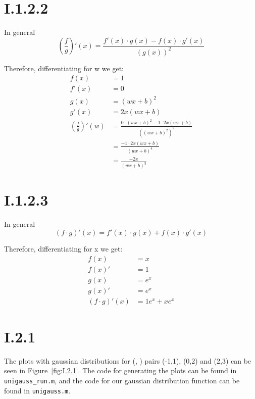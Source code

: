 \section*{I.1.2.2}
In general
\[
	\left ( \frac{f}{g} \right )' (x) = \frac{f'(x) \cdot g(x) - f(x) \cdot g'(x)}{(g(x))^2}
\]

Therefore, differentiating for w we get:
\begin{align*}
	f(x) &= 1 \\
	f'(x) &= 0 \\
	g(x) &= (wx+b)^2 \\
	g'(x) &= 2x(wx+b) \\
	\left ( \frac{f}{g} \right )' (w) &= \frac{0 \cdot (wx+b)^2 - 1 \cdot 2x(wx+b)}{((wx+b)^2)^2} \\
	&= \frac{-1 \cdot 2x(wx+b)}{(wx+b)^4} \\
	&= \frac{-2x}{(wx+b)^3}
\end{align*}

\section*{I.1.2.3}
In general
\[
	\left ( f \cdot g \right )' (x) = f'(x) \cdot g(x) + f(x) \cdot g'(x)
\]

Therefore, differentiating for x we get:
\begin{align*}
	f(x) &= x \\
	f(x)' &= 1 \\
	g(x) &= e^x \\
	g(x)' &= e^x \\
	\left ( f \cdot g \right )' (x) &= 1e^x + xe^x
\end{align*}

\pagebreak
\section*{I.2.1}
The plots with gaussian distributions for (\mu, \sigma) pairs (-1,1), (0,2) and
(2,3) can be seen in Figure~\ref{fig:I.2.1}. The code for generating the plots
can be found in \texttt{unigauss\_run.m}, and the code for our gaussian
distribution function can be found in \texttt{unigauss.m}.

